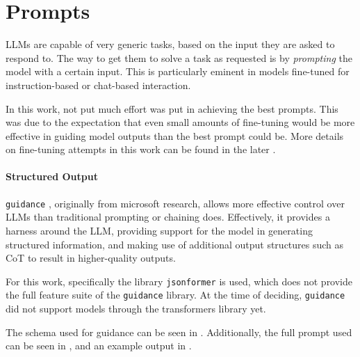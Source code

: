 


\section{Prompts}\label{sec:prompts}
\glspl{LLM} are capable of very generic tasks, based on the input they are asked to respond to.
The way to get them to solve a task as requested is by \textit{prompting} the model with a certain input.
This is particularly eminent in models fine-tuned for instruction-based or chat-based interaction.

In this work, not put much effort was put in achieving the best prompts.
This was due to the expectation that even small amounts of fine-tuning would be more effective in guiding model outputs than the best prompt could be.
More details on fine-tuning attempts in this work can be found in the later .

\paragraph{Structured Output}
\texttt{guidance} \cite{guidance_2023}, originally from \gls{microsoft} research, allows more effective control over \glspl{LLM} than traditional prompting or chaining does.
Effectively, it provides a harness around the \gls{LLM}, providing support for the model in generating structured information, and making use of additional output structures such as CoT \cite{wei_chainofthought_2022} to result in higher-quality outputs.

For this work, specifically the library \texttt{jsonformer} \cite{1rgs_2023} is used, which does not provide the full feature suite of the \texttt{guidance} library.
At the time of deciding, \texttt{guidance} did not support models through the \gls{transformers} library yet.

The schema used for guidance can be seen in .
Additionally, the full prompt used can be seen in , and an example output in .




